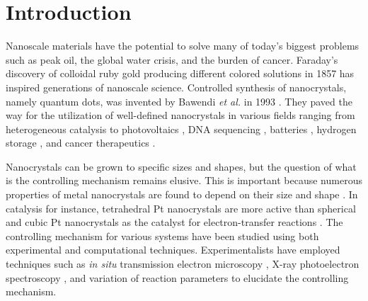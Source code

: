 
\section{Introduction}


Nanoscale materials have the potential to solve many of today's biggest problems such as peak oil, the global water crisis, and the burden of cancer.
Faraday's discovery of colloidal ruby gold producing different colored solutions in 1857 \cite{Faraday_1857,Thompson_2007} has inspired generations of nanoscale science.
Controlled synthesis of nanocrystals, namely quantum dots, was invented by Bawendi \textit{et al.} in 1993 \cite{hakimi1993quantum,Murray_2000}.
They paved the way for the utilization of well-defined nanocrystals in various fields ranging from heterogeneous catalysis \cite{astruc2008nanoparticles,Astruc_2006} to photovoltaics \cite{Atwater_2010}, DNA sequencing \cite{McNally_2010}, batteries \cite{Panniello_2014}, hydrogen storage \cite{Jena_2011,Ramos_Castillo_2015}, and cancer therapeutics \cite{Jain_2010,Kim_2010}.


Nanocrystals can be grown to specific sizes and shapes, but the question of what is the controlling mechanism remains elusive.
This is important because numerous properties of metal nanocrystals are found to depend on their size \cite{Roduner_2006} and shape \cite{Xia_2008}.
In catalysis for instance, tetrahedral Pt nanocrystals are more active than spherical and cubic Pt nanocrystals as the catalyst for electron-transfer reactions \cite{Narayanan_2005}.
The controlling mechanism for various systems have been studied using both experimental and computational techniques.
Experimentalists have employed techniques such as \textit{in situ} transmission electron microscopy \cite{Liao_2014,Woehl_2014}, X-ray photoelectron spectroscopy \cite{Gao_2004,Park_2014,Huang_1996,Kedia_2012,Bonet_2000}, and variation of reaction parameters \cite{Personick_2013,Xia_2012,Zeng_2010,Zhang_1996,Chang_2011,Zhu_2011} to elucidate the controlling mechanism.

  